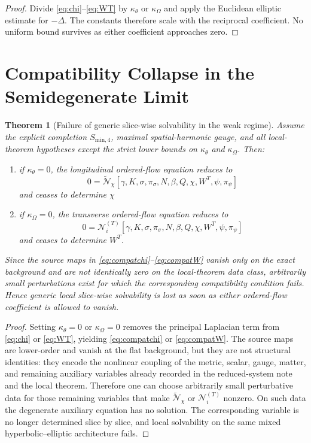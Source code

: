 \documentclass[11pt]{article}
\newtheorem{theorem}{Theorem}
\begin{document}
\begin{proof}
Divide \eqref{eq:chi}--\eqref{eq:WT} by \(\kappa_\theta\) or \(\kappa_\Omega\) and apply the Euclidean elliptic estimate for \(-\Delta\). The constants therefore scale with the reciprocal coefficient. No uniform bound survives as either coefficient approaches zero.
\end{proof}

\section{Compatibility Collapse in the Semidegenerate Limit}

\begin{theorem}[Failure of generic slice-wise solvability in the weak regime]
Assume the explicit completion \(S_{\mathrm{min},4}\), maximal spatial-harmonic gauge, and all local-theorem hypotheses except the strict lower bounds on \(\kappa_\theta\) and \(\kappa_\Omega\). Then:
\begin{enumerate}
    \item if \(\kappa_\theta=0\), the longitudinal ordered-flow equation reduces to
    \begin{equation}
    0=\widetilde{\mathcal N}_\chi[\gamma,K,\sigma,\pi_\sigma,N,\beta,Q,\chi,W^T,\psi,\pi_\psi]
    \label{eq:compatchi}
    \end{equation}
    and ceases to determine \(\chi\)
    \item if \(\kappa_\Omega=0\), the transverse ordered-flow equation reduces to
    \begin{equation}
    0=\mathcal N_i^{(T)}[\gamma,K,\sigma,\pi_\sigma,N,\beta,Q,\chi,W^T,\psi,\pi_\psi]
    \label{eq:compatW}
    \end{equation}
    and ceases to determine \(W^T\).
\end{enumerate}
Since the source maps in \eqref{eq:compatchi}--\eqref{eq:compatW} vanish only on the exact background and are not identically zero on the local-theorem data class, arbitrarily small perturbations exist for which the corresponding compatibility condition fails. Hence generic local slice-wise solvability is lost as soon as either ordered-flow coefficient is allowed to vanish.
\end{theorem}

\begin{proof}
Setting \(\kappa_\theta=0\) or \(\kappa_\Omega=0\) removes the principal Laplacian term from \eqref{eq:chi} or \eqref{eq:WT}, yielding \eqref{eq:compatchi} or \eqref{eq:compatW}. The source maps are lower-order and vanish at the flat background, but they are not structural identities: they encode the nonlinear coupling of the metric, scalar, gauge, matter, and remaining auxiliary variables already recorded in the reduced-system note and the local theorem. Therefore one can choose arbitrarily small perturbative data for those remaining variables that make \(\widetilde{\mathcal N}_\chi\) or \(\mathcal N_i^{(T)}\) nonzero. On such data the degenerate auxiliary equation has no solution. The corresponding variable is no longer determined slice by slice, and local solvability on the same mixed hyperbolic--elliptic architecture fails.
\end{proof}
\end{document}
